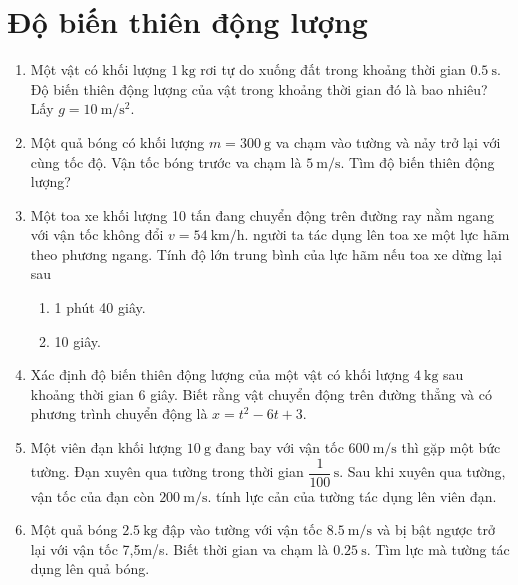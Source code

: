 \section{Độ biến thiên động lượng}
\begin{enumerate}
	\item %
	Một vật có khối lượng $\SI{1}{\kilogram}$ rơi tự do xuống đất trong khoảng thời gian $\SI{0,5}{\second}$. Độ biến thiên động lượng của vật trong khoảng thời gian đó là bao nhiêu? Lấy $g=\SI{10}{\meter/\second^2}$.
	\item %
	Một quả bóng có khối lượng $m=\SI{300}{\gram}$ va chạm vào tường và nảy trở lại với cùng tốc độ. Vận tốc bóng trước va chạm là $\SI{5}{\meter/\second}$. Tìm độ biến thiên động lượng?
	\item %
	Một toa xe khối lượng 10 tấn đang chuyển động trên đường ray nằm ngang với vận tốc không đổi $v=\SI{54}{\kilo\meter/\hour}$. người ta tác dụng lên toa xe một lực hãm theo phương ngang. Tính độ lớn trung bình của lực hãm nếu toa xe dừng lại sau
	\begin{enumerate}[label=\alph*)]
		\item 1 phút 40 giây.
		\item 10 giây.
	\end{enumerate}
	\item %
	Xác định độ biến thiên động lượng của một vật có khối lượng $\SI{4}{\kilogram}$ sau khoảng thời gian 6 giây. Biết rằng vật chuyển động trên đường thẳng và có phương trình chuyển động là $x=t^2-6t+3$.
	\item %
	Một viên đạn khối lượng $\SI{10}{\gram}$ đang bay với vận tốc $\SI{600}{\meter/\second}$ thì gặp một bức tường. Đạn xuyên qua tường trong thời gian $\dfrac{1}{100}\,\text{s}$. Sau khi xuyên qua tường, vận tốc của đạn còn $\SI{200}{\meter/\second}$. tính lực cản của tường tác dụng lên viên đạn.
	\item %
	Một quả bóng $\SI{2,5}{\kilogram}$ đập vào tường với vận tốc $\SI{8,5}{\meter/\second}$ và bị bật ngược trở lại với vận tốc 7,5m/s. Biết thời gian va chạm là $\SI{0,25}{\second}$. Tìm lực mà tường tác dụng lên quả bóng.
\end{enumerate}

